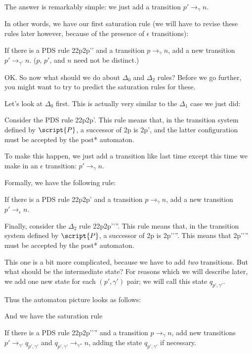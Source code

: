 \documentclass{article}
\newcommand{\config}{2}{\ensuremath{\langle #1, #2 \rangle}}
\newcommand{\rule}{2}{\ensuremath{#1 \righthookarrow #2}}
\newcommand{\trans}[3]{\ensuremath{#1 \rightarrow_{#2} #3}}
\begin{document}
\begin{defintion}
The answer is remarkably simple: we just add a transition
$\trans{p'}{\gamma}{n}$.

In other words, we have our first saturation rule (we will have to
revise these rules later however, because of the presence of
$\epsilon$ transitions):

   If there is a PDS rule
   \rule{\config{p}{\gamma}}{\config{p'}{\gamma'}} and a transition
   \trans{p}{\gamma}{n}, add a new transition
   \trans{p'}{\gamma'}{n}. ($p$, $p'$, and $n$ need not be distinct.)

OK. So now what should we do about $\Delta_0$ and $\Delta_2$ rules?
Before we go further, you might want to try to predict the saturation
rules for these.

Let's look at $\Delta_0$ first. This is actually very similar to the
$\Delta_1$ case we just did:

Consider the PDS rule
\rule{\config{p}{\gamma}}{\config{p'}{\epsilon}}. This rule means that,
in the transition system defined by $\script{P}$, a successor of
\config{p}{\gamma\alpha} is \config{p'}{\alpha}, and the latter
configuration must be accepted by the post* automaton.

To make this happen, we just add a transition like last time except
this time we make in an $\epsilon$ transition:
$\trans{p'}{\gamma}{n}$.

Formally, we have the following rule:

   If there is a PDS rule
   \rule{\config{p}{\gamma}}{\config{p'}{\epsilon}} and a transition
   \trans{p}{\gamma}{n}, add a new transition
   \trans{p'}{\epsilon}{n}.

Finally, consider the $\Delta_2$ rule
\rule{\config{p}{\gamma}}{\config{p'}{\gamma'\gamma''}}. This rule
means that, in the transition system defined by $\script{P}$, a
successor of \config{p}{\gamma\alpha} is
\config{p'}{\gamma'\gamma''\alpha}. This means that
\config{p'}{\gamma'\gamma''\alpha} must be accepted by the post*
automaton.

This one is a bit more complicated, because we have to add \emph{two}
transitions. But what should be the intermediate state? For reasons
which we will describe later, we add one new state for each
$(p',\gamma')$ pair; we will call this state $q_{p',\gamma'}$.

Thus the automaton picture looks as follows:

And we have the saturation rule

   If there is a PDS rule
   \rule{\config{p}{\gamma}}{\config{p'}{\gamma'\gamma''}} and a
   transition \trans{p}{\gamma}{n}, add new transitions
   \trans{p'}{\gamma'}{q_{p',\gamma'}} and
   \trans{q_{p',\gamma'}}{\gamma''}{n}, adding the state $q_{p',\gamma'}$
   if necessary.



\end{defintion}
\end{document}
